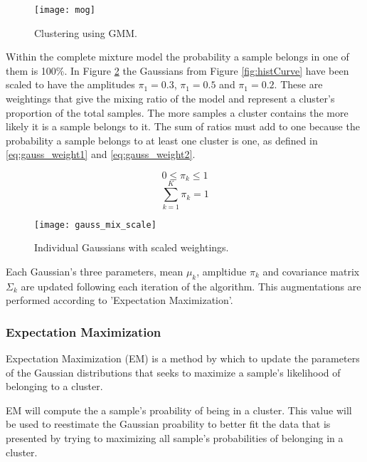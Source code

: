 \begin{figure}[H]
	\centering
	\centering\texttt{[image: mog]}
	\caption{Clustering using GMM.}
	\label{fig:mogcov}
\end{figure}
  
Within the complete mixture model the probability a sample belongs in one of them is 100\%. In Figure \ref{fig:histScale} the Gaussians from Figure \ref{fig:histCurve} have been scaled to have the amplitudes $\pi_1 = 0.3$, $\pi_1 = 0.5$ and $\pi_1 = 0.2$. These are weightings that give the mixing ratio of the model and represent a cluster's proportion of the total samples. The more samples a cluster contains the more likely it is a sample belongs to it. The sum of ratios must add to one because the probability a sample belongs to at least one cluster is one, as defined in \ref{eq:gauss_weight1} and \ref{eq:gauss_weight2}.

\begin{equation}
    0\leq \pi_k \leq 1
\label{eq:gauss_weight1}
\end{equation}
\begin{equation}
    \sum_{k=1}^{K}\pi_k = 1
\label{eq:gauss_weight2}
\end{equation}


\begin{figure}[H]
    \centering
    \centering\texttt{[image: gauss\_mix\_scale]}
    \caption{Individual Gaussians with scaled weightings.}
    \label{fig:histScale}
  \end{figure} 

Each Gaussian's three parameters, mean $\mu_k$, ampltidue $\pi_k$ and covariance matrix $\Sigma_k$ are updated following each iteration of the algorithm. This augmentations are performed according to 'Expectation Maximization'.

\subsubsection{Expectation Maximization}

Expectation Maximization (EM) is a method by which to update the parameters of the Gaussian distributions that seeks to maximize a sample's likelihood of belonging to a cluster. 

EM will compute the a sample's proability  of being in a cluster. This value will be used to reestimate the Gaussian proability to better fit the data that is presented by trying to maximizing all sample's probabilities of belonging in a cluster.

